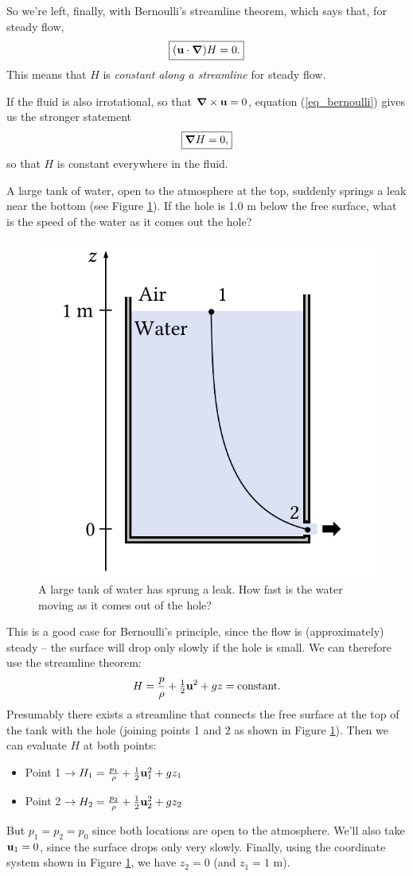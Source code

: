 So we're left, finally, with Bernoulli's streamline theorem, which says that, for steady flow,
\begin{equation}
\boxed{
(\mathbf{u} \cdot \boldsymbol{\nabla}) H  = 0.
}
\end{equation}
This means that $H$ is \emph{constant along a streamline} for steady flow.

If the fluid is also irrotational, so that $\boldsymbol{\nabla} \times \mathbf{u} = 0$, equation (\ref{eq_bernoulli}) gives us the stronger statement
\begin{equation}
\boxed{
\boldsymbol{\nabla} H = 0,
}
\end{equation}
so that $H$ is constant everywhere in the fluid.

\begin{example}
A large tank of water, open to the atmosphere at the top, suddenly springs a leak near the bottom (see Figure \ref{fig_leaky_bucket}).  If the hole is 1.0 m below the free surface, what is the speed of the water as it comes out the hole?

\begin{figure}
\centering\includegraphics[width=0.5\linewidth]{Figures/Chapter3/fig_leaky_bucket}
\caption{A large tank of water has sprung a leak.  How fast is the water moving as it comes out of the hole?}
\label{fig_leaky_bucket}
\end{figure}


This is a good case for Bernoulli's principle, since the flow is (approximately) steady -- the surface will drop only slowly if the hole is small.  We can therefore use the streamline theorem:
\[
H = \frac{p}{\rho} + \tfrac{1}{2} \mathbf{u}^2 + gz = \text{constant}.
\]
Presumably there exists a streamline that connects the free surface at the top of the tank with the hole (joining points 1 and 2 as shown in Figure \ref{fig_leaky_bucket}).  Then we can evaluate $H$ at both points:
\begin{itemize}
\item Point 1 $\to H_1 = \frac{p_1}{\rho} + \tfrac{1}{2} \mathbf{u}_1^2 + gz_1$
\item Point 2 $\to H_2 = \frac{p_2}{\rho} + \tfrac{1}{2} \mathbf{u}_2^2 + gz_2$
\end{itemize}
But $p_1 = p_2 = p_0$ since both locations are open to the atmosphere.  We'll also take $\mathbf{u}_1 = 0$, since the surface drops only very slowly.  Finally, using the coordinate system shown in Figure \ref{fig_leaky_bucket}, we have $z_2 = 0$ (and $z_1 = 1$ m).


\end{example}
